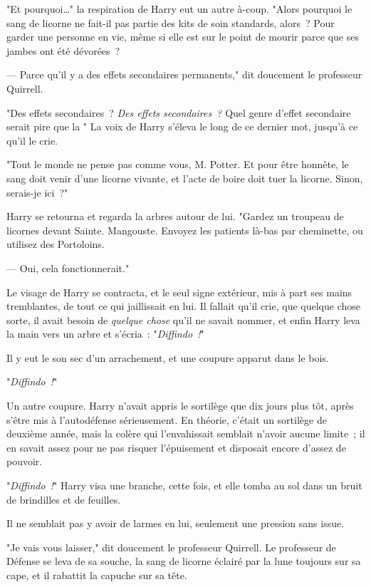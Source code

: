 "Et pourquoi…" la respiration de Harry eut un autre à-coup. "Alors pourquoi le sang de licorne ne fait-il pas partie des kits de soin standards, alors~? Pour garder une personne en vie, même si elle est sur le point de mourir parce que ses jambes ont été dévorées~?

--- Parce qu'il y a des effets secondaires permanents," dit doucement le professeur Quirrell.

"Des effets secondaires~? \emph{Des effets secondaires~?} Quel genre d'effet secondaire serait pire que la " La voix de Harry s'éleva le long de ce dernier mot, jusqu'à ce qu'il le crie.

"Tout le monde ne pense pas comme vous, M. Potter. Et pour être honnête, le sang doit venir d'une licorne vivante, et l'acte de boire doit tuer la licorne. Sinon, serais-je ici~?"

Harry se retourna et regarda la arbres autour de lui. "Gardez un troupeau de licornes devant Sainte. Mangouste. Envoyez les patients là-bas par cheminette, ou utilisez des Portoloins.

--- Oui, cela fonctionnerait."

Le visage de Harry se contracta, et le seul signe extérieur, mis à part ses mains tremblantes, de tout ce qui jaillissait en lui. Il fallait qu'il crie, que quelque chose sorte, il avait besoin de \emph{quelque chose} qu'il ne savait nommer, et enfin Harry leva la main vers un arbre et s'écria~: "\emph{Diffindo~!}"

Il y eut le son sec d'un arrachement, et une coupure apparut dans le bois.

"\emph{Diffindo~!}"

Un autre coupure. Harry n'avait appris le sortilège que dix jours plus tôt, après s'être mis à l'autodéfense sérieusement. En théorie, c'était un sortilège de deuxième année, mais la colère qui l'envahissait semblait n'avoir aucune limite~; il en savait assez pour ne pas risquer l'épuisement et disposait encore d'assez de pouvoir.

"\emph{Diffindo~!}" Harry visa une branche, cette fois, et elle tomba au sol dans un bruit de brindilles et de feuilles.

Il ne semblait pas y avoir de larmes en lui, seulement une pression sans issue.

"Je vais vous laisser," dit doucement le professeur Quirrell. Le professeur de Défense se leva de sa souche, la sang de licorne éclairé par la lune toujours sur sa cape, et il rabattit la capuche sur sa tête. 

